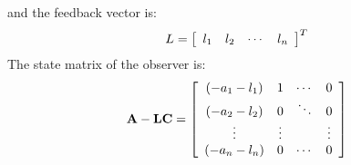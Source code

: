 and the feedback vector is:
\[
L = \left[ {\begin{array}{*{20}c}
   {l_1 } & {l_2 } &  \cdots  & {l_n }  \\
\end{array}} \right]^T 
\]
The state matrix of the observer is:
\[
{\bf{A}} - {\bf{LC}} = \left[ {\begin{array}{*{20}c}
   {( - a_1  - l_1 )} & 1 &  \cdots  & 0  \\
   {( - a_2  - l_2 )} & 0 &  \ddots  & 0  \\
    \vdots  &  \vdots  & {} &  \vdots   \\
   {( - a_n  - l_n )} & 0 &  \cdots  & 0  \\
\end{array}} \right]
\]
 
 

\endinput

